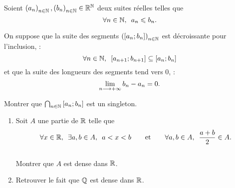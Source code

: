 \begin{corr}
\end{corr}

\begin{exo}
Soient \(\left(a_n\right)_{n\in\mathbb{N}},\left(b_n\right)_{n\in\mathbb{N}}\in\mathbb{R}^{\mathbb{N}}\) deux suites réelles telles que \[\quantifs{\forall n\in\N}a_n\leq b_n.\]

On suppose que la suite des segments \(\left(\left[a_n;b_n\right]\right)_{n\in\mathbb{N}}\) est décroissante pour l'inclusion, \cad : \[\quantifs{\forall n\in\N}\intervii{a_{n+1}}{b_{n+1}}\subset\intervii{a_n}{b_n}\] et que la suite des longueurs des segments tend vers \(0\), \cad : \[\lim_{n\longrightarrow+\infty}b_n-a_n=0.\]

Montrer que \(\bigcap_{n\in\mathbb{N}}\left[a_n;b_n\right]\) est un singleton.
\end{exo}

\begin{corr}
\end{corr}

\begin{exo}[Exercice 12]
\begin{enumerate}
\item Soit \(A\) une partie de \(\mathbb{R}\) telle que \[\quantifs{\forall x\in\R;\exists a,b\in A}a<x<b\qquad\text{et}\qquad\quantifs{\forall a,b\in A}\dfrac{a+b}{2}\in A.\] \\

Montrer que \(A\) est dense dans \(\mathbb{R}\). \\

\item Retrouver le fait que \(\mathbb{Q}\) est dense dans \(\mathbb{R}\).
\end{enumerate}
\end{exo}

\begin{corr}
\end{corr}


